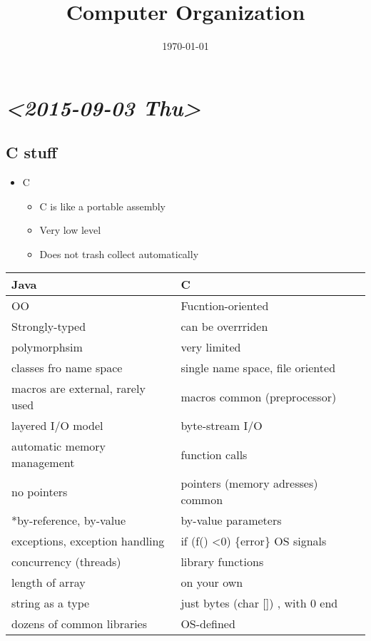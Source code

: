 \documentclass[11pt]{article}
\date{\today}
\title{Computer Organization}
\begin{document}
\maketitle
\tableofcontents


\section{\textit{<2015-09-03 Thu>}}
\label{sec-1}
\subsection{C stuff}
\label{sec-1-1}
\begin{itemize}
\item C
\begin{itemize}
\item C is like a portable assembly
\item Very low level
\item Does not trash collect automatically
\end{itemize}
\end{itemize}
\begin{center}
\begin{tabular}{ll}
Java & C\\
\hline
OO & Fucntion-oriented\\
Strongly-typed & can be overrriden\\
polymorphsim & very limited\\
classes fro name space & single name space, file oriented\\
macros are external, rarely used & macros common (preprocessor)\\
layered I/O model & byte-stream I/O\\
automatic memory management & function calls\\
no pointers & pointers (memory adresses) common\\
*by-reference, by-value & by-value parameters\\
exceptions, exception handling & if (f() <0) \{error\} OS signals\\
concurrency (threads) & library functions\\
length of array & on your own\\
string as a type & just bytes (char []) , with 0 end\\
dozens of common libraries & OS-defined\\
\end{tabular}
\end{center}
\end{document}
